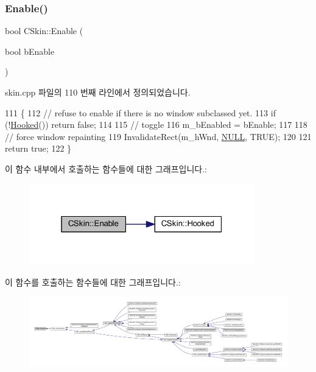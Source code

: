 \subsubsection{\texorpdfstring{Enable()}{Enable()}}
{\footnotesize\ttfamily bool C\+Skin\+::\+Enable (\begin{DoxyParamCaption}\item[{bool}]{b\+Enable }\end{DoxyParamCaption})}



skin.\+cpp 파일의 110 번째 라인에서 정의되었습니다.


\begin{DoxyCode}
111 \{
112   \textcolor{comment}{// refuse to enable if there is no window subclassed yet.}
113   \textcolor{keywordflow}{if} (!\mbox{\hyperlink{class_c_skin_a99b438d858bbafa83569f19e707ba3c9}{Hooked}}()) \textcolor{keywordflow}{return} \textcolor{keyword}{false};
114 
115   \textcolor{comment}{// toggle}
116   m\_bEnabled = bEnable;
117 
118   \textcolor{comment}{// force window repainting}
119   InvalidateRect(m\_hWnd, \mbox{\hyperlink{getopt1_8c_a070d2ce7b6bb7e5c05602aa8c308d0c4}{NULL}}, TRUE);
120 
121   \textcolor{keywordflow}{return} \textcolor{keyword}{true};
122 \}
\end{DoxyCode}
이 함수 내부에서 호출하는 함수들에 대한 그래프입니다.\+:
\nopagebreak
\begin{figure}[H]
\begin{center}
\leavevmode
\includegraphics[width=277pt]{class_c_skin_ad6adaa12dbedc193c907d4a1b2c2445b_cgraph}
\end{center}
\end{figure}
이 함수를 호출하는 함수들에 대한 그래프입니다.\+:
\nopagebreak
\begin{figure}[H]
\begin{center}
\leavevmode
\includegraphics[width=350pt]{class_c_skin_ad6adaa12dbedc193c907d4a1b2c2445b_icgraph}
\end{center}
\end{figure}
\mbox{\label{class_c_skin_adb8775c6c421ab3551b51e803bcf20d3}} 

